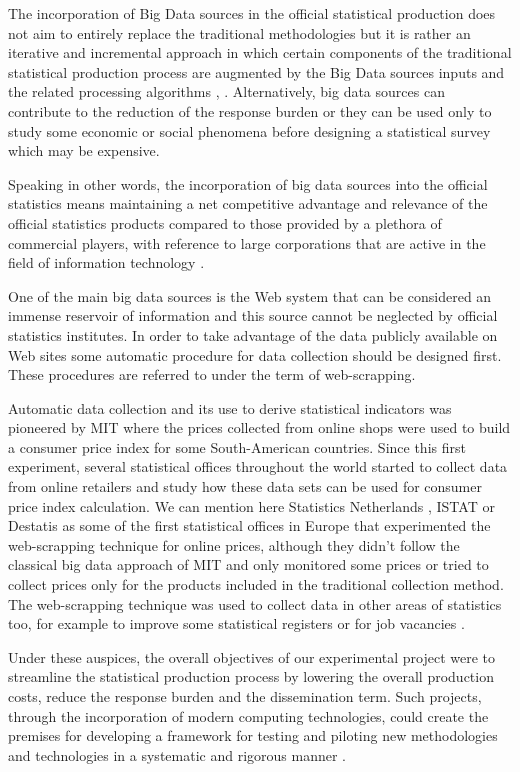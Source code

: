 \documentclass[]{article}
\begin{document}
The incorporation of Big Data sources in the official statistical production does not aim to entirely replace the 
traditional methodologies but it is rather an iterative and incremental approach in which certain components of the traditional 
statistical production process are augmented by the Big Data sources inputs and the related processing algorithms 
\cite{grif2016_1}, \cite{grif2016_2}. Alternatively, big data sources can contribute to the reduction of the response burden 
or they can be used only to study some economic or social phenomena before designing a statistical survey which may be expensive. 

Speaking in other words, the incorporation of big data sources into the official statistics means maintaining a net competitive advantage and 
relevance of the official statistics products compared to those provided by a plethora of commercial players, with reference to 
large corporations that are active in the field of information technology \cite{eu2012}.

One of the main big data sources is the Web system that can be considered an immense reservoir of information and this source cannot be neglected
by official statistics institutes. In order to take advantage of the data publicly available on Web sites some automatic procedure for data collection 
should be designed first. These procedures are referred to under the term of web-scrapping.

Automatic data collection and its use to derive statistical indicators was pioneered by MIT \cite{MIT} where the prices collected 
from online shops were used to build a consumer price index for some South-American countries. Since this first experiment, several
statistical offices throughout the world started to collect data from online retailers and study how these data sets can be used
for consumer price index calculation. We can mention here Statistics Netherlands \cite{cbs}, ISTAT \cite{polidoro}  
or Destatis \cite{bruner} as some of the first statistical offices in Europe that experimented the web-scrapping technique for online prices, 
although they didn't follow the classical big data approach of MIT and only monitored some prices or tried to collect prices
only for the products included in the traditional collection method. The web-scrapping technique was used to collect data in other areas
of statistics too, for example to improve some statistical registers \cite{barcoli} or for job vacancies \cite{swier}.


Under these auspices, the overall objectives of our experimental project were to streamline the statistical production process by 
lowering the overall production costs, reduce the response burden and the dissemination term. Such projects, through the incorporation 
of modern computing technologies, could create the premises for developing a framework for testing and piloting new methodologies 
and technologies in a systematic and rigorous manner \cite{ons2017}. 
\end{document}

